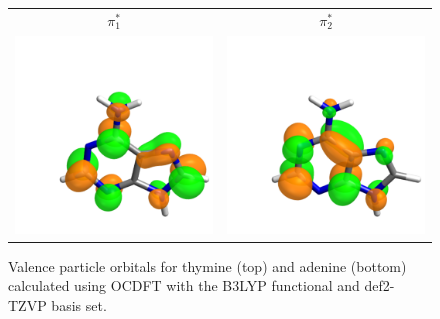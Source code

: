 \documentclass[11.5pt]{article}
\begin{document}
\begin{figure}[!ht]
\begin{tabular}{ c  c }
  $\pi_1^*$ & $\pi_2^*$ \\
  \includegraphics[scale=0.1]{Ade_PiStar1.pdf} & \includegraphics[scale=0.1]{Ade_PiStar2.pdf} 
  \end{tabular}
  \caption{Valence particle orbitals for thymine (top) and adenine (bottom) calculated using OCDFT with the B3LYP functional and def2-TZVP basis set.}
  \label{fig:orbitals}
\end{figure}
\end{document}
